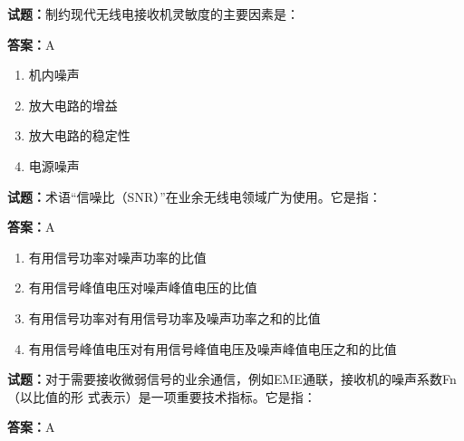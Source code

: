 \documentclass{ctexbook}
\begin{document}




\vspace{1em}

\textbf{试题：}制约现代无线电接收机灵敏度的主要因素是： 

\textbf{答案：}A 

\begin{enumerate}[leftmargin=3em]
  \item 机内噪声 

  \item 放大电路的增益 

  \item 放大电路的稳定性 


  \item 电源噪声 

\end{enumerate}





\vspace{1em}

\textbf{试题：}术语“信噪比（SNR）”在业余无线电领域广为使用。它是指： 

\textbf{答案：}A 

\begin{enumerate}[leftmargin=3em]
  \item 有用信号功率对噪声功率的比值 

  \item 有用信号峰值电压对噪声峰值电压的比值 

  \item 有用信号功率对有用信号功率及噪声功率之和的比值 

  \item 有用信号峰值电压对有用信号峰值电压及噪声峰值电压之和的比值 

\end{enumerate}





\vspace{1em}

\textbf{试题：}对于需要接收微弱信号的业余通信，例如EME通联，接收机的噪声系数Fn（以比值的形
式表示）是一项重要技术指标。它是指： 

\textbf{答案：}A 
\end{document}
